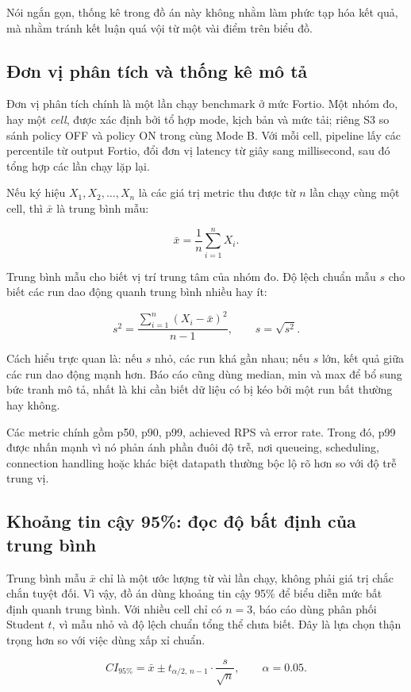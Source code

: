 Nói ngắn gọn, thống kê trong đồ án này không nhằm làm phức tạp hóa kết quả, mà nhằm tránh kết luận quá vội từ một vài điểm trên biểu đồ.

\subsection{Đơn vị phân tích và thống kê mô tả}
Đơn vị phân tích chính là một lần chạy benchmark ở mức Fortio. Một nhóm đo, hay một \textit{cell}, được xác định bởi tổ hợp mode, kịch bản và mức tải; riêng S3 so sánh policy OFF và policy ON trong cùng Mode B. Với mỗi cell, pipeline lấy các percentile từ output Fortio, đổi đơn vị latency từ giây sang millisecond, sau đó tổng hợp các lần chạy lặp lại.

Nếu ký hiệu \(X_1, X_2, \ldots, X_n\) là các giá trị metric thu được từ \(n\) lần chạy cùng một cell, thì \(\bar{x}\) là trung bình mẫu:

\[
\bar{x} = \frac{1}{n}\sum_{i=1}^{n}X_i.
\]

Trung bình mẫu cho biết vị trí trung tâm của nhóm đo. Độ lệch chuẩn mẫu \(s\) cho biết các run dao động quanh trung bình nhiều hay ít:

\[
s^2 = \frac{\sum_{i=1}^{n}(X_i-\bar{x})^2}{n-1}, \qquad s=\sqrt{s^2}.
\]

Cách hiểu trực quan là: nếu \(s\) nhỏ, các run khá gần nhau; nếu \(s\) lớn, kết quả giữa các run dao động mạnh hơn. Báo cáo cũng dùng median, min và max để bổ sung bức tranh mô tả, nhất là khi cần biết dữ liệu có bị kéo bởi một run bất thường hay không.

Các metric chính gồm p50, p90, p99, achieved RPS và error rate. Trong đó, p99 được nhấn mạnh vì nó phản ánh phần đuôi độ trễ, nơi queueing, scheduling, connection handling hoặc khác biệt datapath thường bộc lộ rõ hơn so với độ trễ trung vị.

\subsection{Khoảng tin cậy 95\%: đọc độ bất định của trung bình}
Trung bình mẫu \(\bar{x}\) chỉ là một ước lượng từ vài lần chạy, không phải giá trị chắc chắn tuyệt đối. Vì vậy, đồ án dùng khoảng tin cậy 95\% để biểu diễn mức bất định quanh trung bình. Với nhiều cell chỉ có \(n=3\), báo cáo dùng phân phối Student \(t\), vì mẫu nhỏ và độ lệch chuẩn tổng thể chưa biết. Đây là lựa chọn thận trọng hơn so với việc dùng xấp xỉ chuẩn.

\[
CI_{95\%} = \bar{x} \pm t_{\alpha/2,\,n-1}\cdot \frac{s}{\sqrt{n}}, \qquad \alpha = 0.05.
\]

